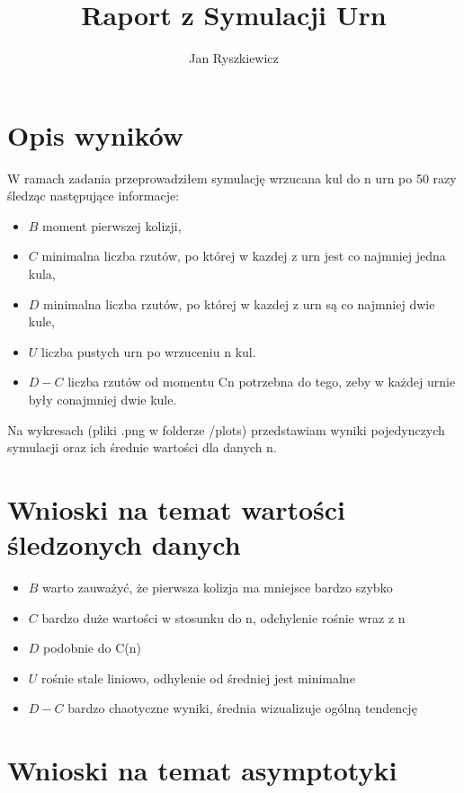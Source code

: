 \documentclass{article}
\title{Raport z Symulacji Urn}
\author{Jan Ryszkiewicz}
\date{}
\begin{document}
\maketitle

\section*{Opis wyników}

W ramach zadania przeprowadziłem symulację wrzucana kul do n urn po 50 razy śledząc następujące informacje:
\begin{itemize}
    \item \( B \) moment pierwszej kolizji,
    \item \( C \) minimalna liczba rzutów, po której w kazdej z urn jest co najmniej jedna kula,
    \item \( D \) minimalna liczba rzutów, po której w kazdej z urn są co najmniej dwie kule,
    \item \( U \) liczba pustych urn po wrzuceniu n kul.
    \item \( D - C \) liczba rzutów od momentu Cn potrzebna do tego, zeby w każdej urnie były conajmniej dwie kule.
\end{itemize}

\noindent Na wykresach (pliki .png w folderze /plots) przedstawiam wyniki pojedynczych symulacji oraz ich średnie wartości dla danych n.

\section*{Wnioski na temat wartości śledzonych danych}

\begin{itemize}
    \item \( B \) warto zauważyć, że pierwsza kolizja ma mniejsce bardzo szybko
    \item \( C \) bardzo duże wartości w stosunku do n, odchylenie rośnie wraz z n
    \item \( D \) podobnie do C(n)
    \item \( U \) rośnie stale liniowo, odhylenie od średniej jest minimalne
    \item \( D - C \) bardzo chaotyczne wyniki, średnia wizualizuje ogólną tendencję

\end{itemize}

\section*{Wnioski na temat asymptotyki}
\end{document}
